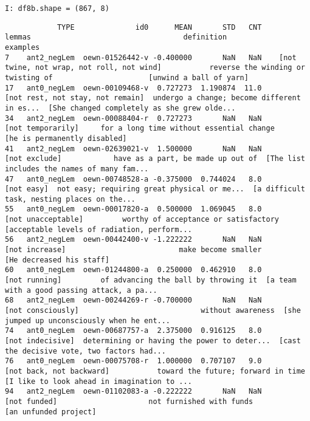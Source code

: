 \documentclass[a4paper,10pt,onecolumn,oneside,openright]{article}
\begin{document}
\begin{verbatim}
I: df8b.shape = (867, 8)
\end{verbatim}

\begin{verbatim}
            TYPE              id0      MEAN       STD   CNT                                       lemmas                                   definition                                     examples
7    ant2_negLem  oewn-01526442-v -0.400000       NaN   NaN    [not twine, not wrap, not roll, not wind]           reverse the winding or twisting of                      [unwind a ball of yarn]
17   ant0_negLem  oewn-00109468-v  0.727273  1.190874  11.0             [not rest, not stay, not remain]  undergo a change; become different in es...  [She changed completely as she grew olde...
34   ant2_negLem  oewn-00088404-r  0.727273       NaN   NaN                            [not temporarily]     for a long time without essential change                 [he is permanently disabled]
41   ant2_negLem  oewn-02639021-v  1.500000       NaN   NaN                                [not exclude]            have as a part, be made up out of  [The list includes the names of many fam...
47   ant0_negLem  oewn-00748528-a -0.375000  0.744024   8.0                                   [not easy]  not easy; requiring great physical or me...  [a difficult task, nesting places on the...
55   ant0_negLem  oewn-00017820-a  0.500000  1.069045   8.0                           [not unacceptable]         worthy of acceptance or satisfactory  [acceptable levels of radiation, perform...
56   ant2_negLem  oewn-00442400-v -1.222222       NaN   NaN                               [not increase]                          make become smaller                     [He decreased his staff]
60   ant0_negLem  oewn-01244800-a  0.250000  0.462910   8.0                                [not running]         of advancing the ball by throwing it  [a team with a good passing attack, a pa...
68   ant2_negLem  oewn-00244269-r -0.700000       NaN   NaN                            [not consciously]                            without awareness  [she jumped up unconsciously when he ent...
74   ant0_negLem  oewn-00687757-a  2.375000  0.916125   8.0                             [not indecisive]  determining or having the power to deter...  [cast the decisive vote, two factors had...
76   ant0_negLem  oewn-00075708-r  1.000000  0.707107   9.0                     [not back, not backward]           toward the future; forward in time  [I like to look ahead in imagination to ...
94   ant2_negLem  oewn-01102083-a -0.222222       NaN   NaN                                 [not funded]                     not furnished with funds                        [an unfunded project]

\end{verbatim}
\end{document}
